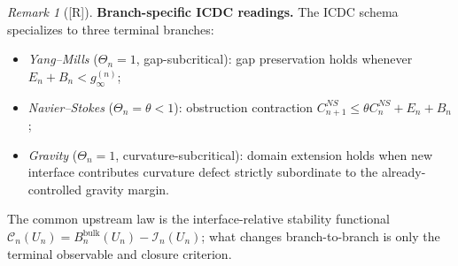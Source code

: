 \documentclass[12pt,oneside]{amsbook}
\theoremstyle{plain}
\theoremstyle{definition}
\theoremstyle{remark}
\newtheorem{remark}[theorem]{Remark}
\newcommand{\status}[1]{\textup{[#1]}}
\begin{document}
\begin{remark}[\status{R}]\label{rem:icdc-branches}
\textbf{Branch-specific ICDC readings.}
The ICDC schema specializes to three terminal branches:
\begin{itemize}
  \item \emph{Yang--Mills} ($\Theta_n = 1$, gap-subcritical): gap
    preservation holds whenever $E_n + B_n < g_\infty^{(n)}$;
  \item \emph{Navier--Stokes} ($\Theta_n = \theta < 1$): obstruction
    contraction $C_{n+1}^{NS} \leq \theta C_n^{NS} + E_n + B_n$;
  \item \emph{Gravity} ($\Theta_n = 1$, curvature-subcritical):
    domain extension holds when new interface contributes curvature
    defect strictly subordinate to the already-controlled gravity margin.
\end{itemize}
The common upstream law is the interface-relative stability
functional $\mathcal{C}_n(U_n) = B_n^{\mathrm{bulk}}(U_n) -
\mathcal{I}_n(U_n)$; what changes branch-to-branch is only the
terminal observable and closure criterion.
\end{remark}
\end{document}
